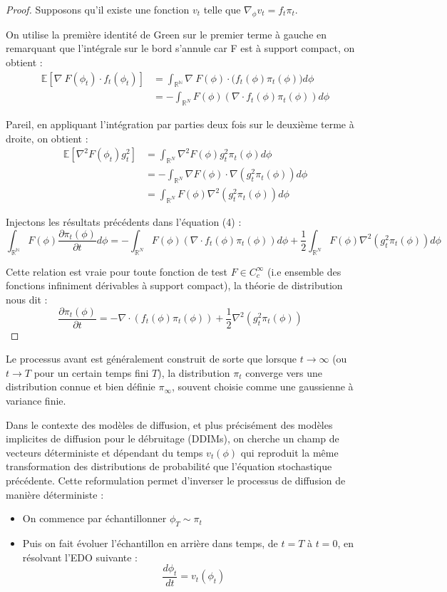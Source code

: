 \documentclass[a4paper,10pt]{article}
\theoremstyle{definition} %
\theoremstyle{definition} %
\theoremstyle{definition} %
\theoremstyle{definition} %
\newcommand{\E}[1]{\mathbb{E}\left[#1\right]}
\newcommand{\R}{\mathbb{R}}
\begin{document}
\begin{proof}
Supposons qu'il existe une fonction $v_t$ telle que $\nabla_{\phi} v_t = f_t \pi_t$.

On utilise la première identité de Green sur le premier terme à gauche en remarquant que l'intégrale sur le bord s'annule car F est à support compact, on obtient :
\begin{align*}
    \E{\nabla\ F(\phi_t)\cdot f_t(\phi_t)}  &=\int_{\mathbb{R^N}} \nabla\ F(\phi)\cdot \big(f_t(\phi) \pi_t(\phi) \bigr)d\phi \\
    &= - \int_{\mathbb{R}^N}F(\phi) (\nabla \cdot f_t(\phi)\pi_t(\phi))d\phi
\end{align*}

Pareil, en appliquant l'intégration par parties deux fois sur le deuxième terme à droite, on obtient :
\begin{align*}
    \E{\nabla^2 F(\phi_t) g_t^2} &= \int_{\mathbb{R}^N } \nabla^2 F(\phi) g_t^2 \pi_t(\phi)d\phi\\
    &= -\int_{\R^N}\nabla F(\phi) \cdot\nabla(g_t^2\pi_t(\phi)) d\phi\\
    &= \int_{\mathbb{R}^N } F(\phi) \nabla^2(g_t^2 \pi_t(\phi)) d\phi
\end{align*}

Injectons les résultats précédents dans l'équation (4) :
\[\int_{\mathbb{R^N}}F(\phi)\frac{\partial\pi_t(\phi)}{\partial t} d\phi = - \int_{\mathbb{R}^N}F(\phi) (\nabla \cdot f_t(\phi)\pi_t(\phi))d\phi + \frac{1}{2}\int_{\mathbb{R}^N } F(\phi) \nabla^2(g_t^2 \pi_t(\phi)) d\phi\]

Cette relation est vraie pour toute fonction de test $F \in C_c^{\infty}$ (i.e ensemble des fonctions infiniment dérivables à support compact), la théorie de distribution nous dit : 
\[\frac{\partial\pi_t(\phi)}{\partial t} = -\nabla \cdot (f_t(\phi)\pi_t(\phi)) + \frac{1}{2}\nabla^2(g_t^2 \pi_t(\phi)) \quad \] 
\end{proof}


Le processus avant est généralement construit de sorte que lorsque $t \rightarrow \infty$ (ou $t \rightarrow T$ pour un certain temps fini $T$), la distribution $\pi_t$ converge vers une distribution connue et bien définie $\pi_{\infty}$, souvent choisie comme une gaussienne à variance finie.

Dans le contexte des modèles de diffusion, et plus précisément des modèles implicites de diffusion pour le débruitage (DDIMs), on cherche un champ de vecteurs déterministe et dépendant du temps $v_t(\phi)$ qui reproduit la même transformation des distributions de probabilité que l'équation stochastique précédente. Cette reformulation permet d'inverser le processus de diffusion de manière déterministe :
\begin{itemize}
    \item On commence par échantillonner $\phi_T \sim \pi_t$
    \item Puis on fait évoluer l'échantillon en arrière dans temps, de $t=T$ à $t = 0$, en résolvant l'EDO suivante :
    \begin{equation}
        \frac{d\phi_t}{dt} = v_t(\phi_t)
    \end{equation}
\end{itemize}
\end{document}
